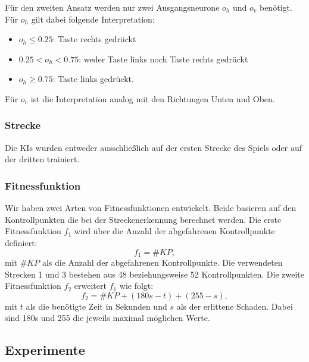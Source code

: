 \documentclass[11pt,final,journal,a4paper,towside,towcolumn]{IEEEtran}
\begin{document}
Für den zweiten Ansatz werden nur zwei Ausgangsneurone $o_h$ und $o_v$ benötigt. Für $o_h$ gilt dabei folgende Interpretation:
\begin{itemize}
	\item $o_h\leq 0.25$: Taste rechts gedrückt
	\item $0.25 < o_h <0.75$: weder Taste links noch Taste rechts gedrückt
	\item $o_h\geq 0.75$: Taste links gedrückt.
\end{itemize}
Für $o_v$ ist die Interpretation analog mit den Richtungen Unten und Oben.

\subsubsection{Strecke}
Die \acp{KI} wurden entweder ausschließlich auf der ersten Strecke des Spiels oder auf der dritten trainiert.

\subsubsection{Fitnessfunktion}
Wir haben zwei Arten von Fitnessfunktionen entwickelt. Beide basieren auf den Kontrollpunkten die bei der Streckenerkennung berechnet werden.
Die erste Fitnessfunktion $f_1$ wird über die Anzahl der abgefahrenen Kontrollpunkte definiert:
\begin{equation}
f_1 = \#KP,
\end{equation}
mit $\#KP$ als die Anzahl der abgefahrenen Kontrollpunkte. Die verwendeten Strecken 1 und 3 bestehen aus 48 beziehungsweise 52 Kontrollpunkten.
Die zweite Fitnessfunktion $f_2$ erweitert $f_1$ wie folgt:
\begin{equation}
f_2=\#KP + (180s-t) + (255 - s),
\end{equation}
mit $t$ als die benötigte Zeit in Sekunden und $s$ als der erlittene Schaden. Dabei sind 180s und 255 die jeweils maximal möglichen Werte.

\subsection{Experimente}
\end{document}
